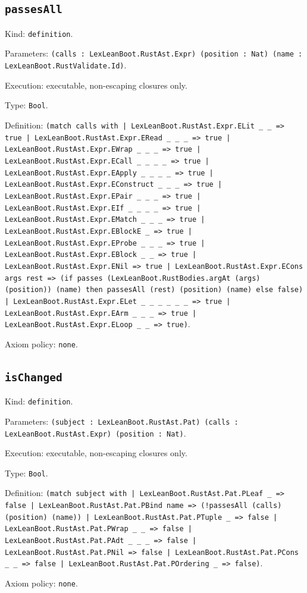 \documentclass[11pt]{article}
\begin{document}
\subsection*{\texttt{passesAll}}
\noindent Kind: \texttt{definition}.\par
\noindent Parameters: \texttt{(calls : LexLeanBoot.RustAst.Expr) (position : Nat) (name : LexLeanBoot.RustValidate.Id)}.\par
\noindent Execution: executable, non-escaping closures only.\par
\noindent Type: \texttt{Bool}.\par
\noindent Definition: \texttt{(match calls with | LexLeanBoot.RustAst.Expr.ELit \_ \_ => true | LexLeanBoot.RustAst.Expr.ERead \_ \_ \_ => true | LexLeanBoot.RustAst.Expr.EWrap \_ \_ \_ => true | LexLeanBoot.RustAst.Expr.ECall \_ \_ \_ \_ => true | LexLeanBoot.RustAst.Expr.EApply \_ \_ \_ \_ => true | LexLeanBoot.RustAst.Expr.EConstruct \_ \_ \_ => true | LexLeanBoot.RustAst.Expr.EPair \_ \_ \_ => true | LexLeanBoot.RustAst.Expr.EIf \_ \_ \_ \_ => true | LexLeanBoot.RustAst.Expr.EMatch \_ \_ \_ => true | LexLeanBoot.RustAst.Expr.EBlockE \_ => true | LexLeanBoot.RustAst.Expr.EProbe \_ \_ \_ => true | LexLeanBoot.RustAst.Expr.EBlock \_ \_ => true | LexLeanBoot.RustAst.Expr.ENil => true | LexLeanBoot.RustAst.Expr.ECons args rest => (if passes (LexLeanBoot.RustBodies.argAt (args) (position)) (name) then passesAll (rest) (position) (name) else false) | LexLeanBoot.RustAst.Expr.ELet \_ \_ \_ \_ \_ \_ => true | LexLeanBoot.RustAst.Expr.EArm \_ \_ \_ => true | LexLeanBoot.RustAst.Expr.ELoop \_ \_ => true)}.\par
\noindent Axiom policy: \texttt{none}.\par
\subsection*{\texttt{isChanged}}
\noindent Kind: \texttt{definition}.\par
\noindent Parameters: \texttt{(subject : LexLeanBoot.RustAst.Pat) (calls : LexLeanBoot.RustAst.Expr) (position : Nat)}.\par
\noindent Execution: executable, non-escaping closures only.\par
\noindent Type: \texttt{Bool}.\par
\noindent Definition: \texttt{(match subject with | LexLeanBoot.RustAst.Pat.PLeaf \_ => false | LexLeanBoot.RustAst.Pat.PBind name => (!passesAll (calls) (position) (name)) | LexLeanBoot.RustAst.Pat.PTuple \_ => false | LexLeanBoot.RustAst.Pat.PWrap \_ \_ => false | LexLeanBoot.RustAst.Pat.PAdt \_ \_ \_ => false | LexLeanBoot.RustAst.Pat.PNil => false | LexLeanBoot.RustAst.Pat.PCons \_ \_ => false | LexLeanBoot.RustAst.Pat.POrdering \_ => false)}.\par
\noindent Axiom policy: \texttt{none}.\par
\end{document}
